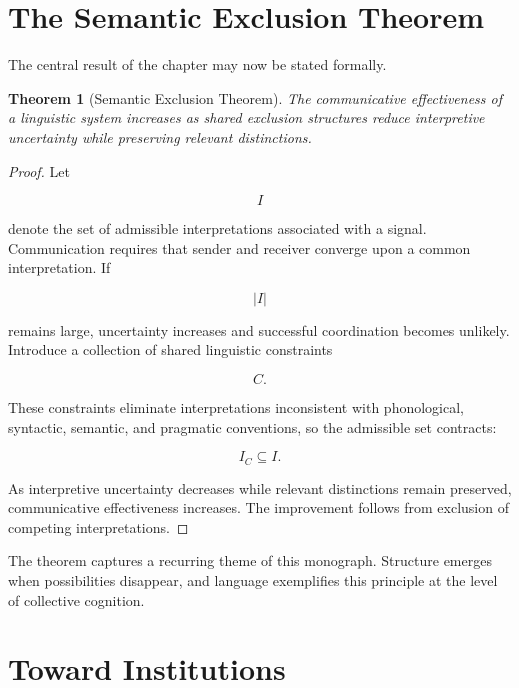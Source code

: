 \documentclass[11pt,oneside]{book}
\theoremstyle{plain}
\newtheorem{theorem}{Theorem}[chapter]
\theoremstyle{definition}
\theoremstyle{remark}
\begin{document}
\section{The Semantic Exclusion Theorem}

The central result of the chapter may now be stated formally.

\begin{theorem}[Semantic Exclusion Theorem]
The communicative effectiveness of a linguistic system increases as shared exclusion structures reduce interpretive uncertainty while preserving relevant distinctions.
\end{theorem}

\begin{proof}
Let

\begin{equation}
I
\end{equation}

denote the set of admissible interpretations associated with a signal. Communication requires that sender and receiver converge upon a common interpretation. If

\begin{equation}
|I|
\end{equation}

remains large, uncertainty increases and successful coordination becomes unlikely. Introduce a collection of shared linguistic constraints

\begin{equation}
C.
\end{equation}

These constraints eliminate interpretations inconsistent with phonological, syntactic, semantic, and pragmatic conventions, so the admissible set contracts:

\begin{equation}
I_C
\subseteq
I.
\end{equation}

As interpretive uncertainty decreases while relevant distinctions remain preserved, communicative effectiveness increases. The improvement follows from exclusion of competing interpretations.
\end{proof}

The theorem captures a recurring theme of this monograph. Structure emerges when possibilities disappear, and language exemplifies this principle at the level of collective cognition.

\section{Toward Institutions}
\end{document}

